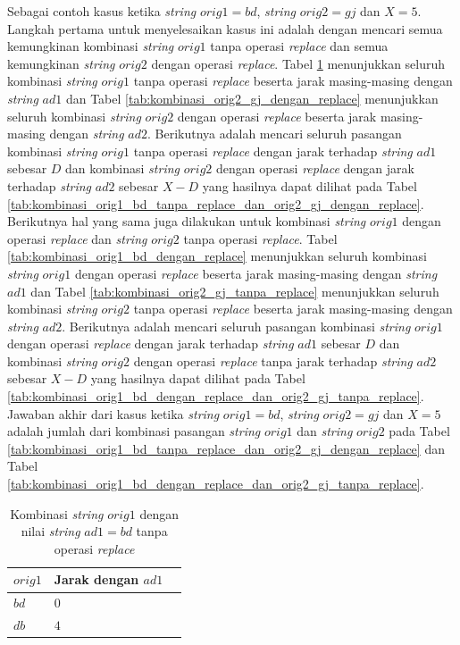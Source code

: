 Sebagai contoh kasus ketika \textit{string} $ orig1=bd $, \textit{string} $ orig2=gj $ dan $ X=5 $. Langkah pertama untuk menyelesaikan kasus ini adalah dengan mencari semua kemungkinan kombinasi \textit{string} $ orig1 $ tanpa operasi \textit{replace} dan semua kemungkinan \textit{string} $ orig2 $ dengan operasi \textit{replace}. Tabel \ref{tab:kombinasi_orig1_bd_tanpa_replace} menunjukkan seluruh kombinasi \textit{string} $ orig1 $ tanpa operasi \textit{replace} beserta jarak masing-masing dengan \textit{string} $ ad1 $ dan Tabel \ref{tab:kombinasi_orig2_gj_dengan_replace} menunjukkan seluruh kombinasi \textit{string} $ orig2 $ dengan operasi \textit{replace} beserta jarak masing-masing dengan \textit{string} $ ad2 $. Berikutnya adalah mencari seluruh pasangan kombinasi \textit{string} $ orig1 $ tanpa operasi \textit{replace} dengan jarak terhadap \textit{string} $ ad1 $ sebesar $ D $ dan kombinasi \textit{string} $ orig2 $ dengan operasi \textit{replace} dengan jarak terhadap \textit{string} $ ad2 $ sebesar $ X-D $ yang hasilnya dapat dilihat pada Tabel \ref{tab:kombinasi_orig1_bd_tanpa_replace_dan_orig2_gj_dengan_replace}. Berikutnya hal yang sama juga dilakukan untuk kombinasi \textit{string} $ orig1 $ dengan operasi \textit{replace} dan \textit{string} $ orig2 $ tanpa operasi \textit{replace}. Tabel \ref{tab:kombinasi_orig1_bd_dengan_replace} menunjukkan seluruh kombinasi \textit{string} $ orig1 $ dengan operasi \textit{replace} beserta jarak masing-masing dengan \textit{string} $ ad1 $ dan Tabel \ref{tab:kombinasi_orig2_gj_tanpa_replace} menunjukkan seluruh kombinasi \textit{string} $ orig2 $ tanpa operasi \textit{replace} beserta jarak masing-masing dengan \textit{string} $ ad2 $. Berikutnya adalah mencari seluruh pasangan kombinasi \textit{string} $ orig1 $ dengan operasi \textit{replace} dengan jarak terhadap \textit{string} $ ad1 $ sebesar $ D $ dan kombinasi \textit{string} $ orig2 $ dengan operasi \textit{replace} tanpa jarak terhadap \textit{string} $ ad2 $ sebesar $ X-D $ yang hasilnya dapat dilihat pada Tabel \ref{tab:kombinasi_orig1_bd_dengan_replace_dan_orig2_gj_tanpa_replace}. Jawaban akhir dari kasus ketika \textit{string} $ orig1=bd $, \textit{string} $ orig2=gj $ dan $ X=5 $ adalah jumlah dari kombinasi pasangan \textit{string} $ orig1 $ dan \textit{string} $ orig2 $ pada Tabel \ref{tab:kombinasi_orig1_bd_tanpa_replace_dan_orig2_gj_dengan_replace} dan Tabel \ref{tab:kombinasi_orig1_bd_dengan_replace_dan_orig2_gj_tanpa_replace}.

\begin{table}
	\centering
	\begin{tabular}{|l|l|l|} \hline
		$ orig1 $ & Jarak dengan $ ad1 $\\ \hline
		$bd$ & $0$ \\ \hline
		$db$ & $4$ \\ \hline
	\end{tabular}
	\caption{Kombinasi \textit{string} $orig1$ dengan nilai \textit{string} $ ad1=bd $ tanpa operasi \textit{replace}}
	\label{tab:kombinasi_orig1_bd_tanpa_replace}
\end{table}

